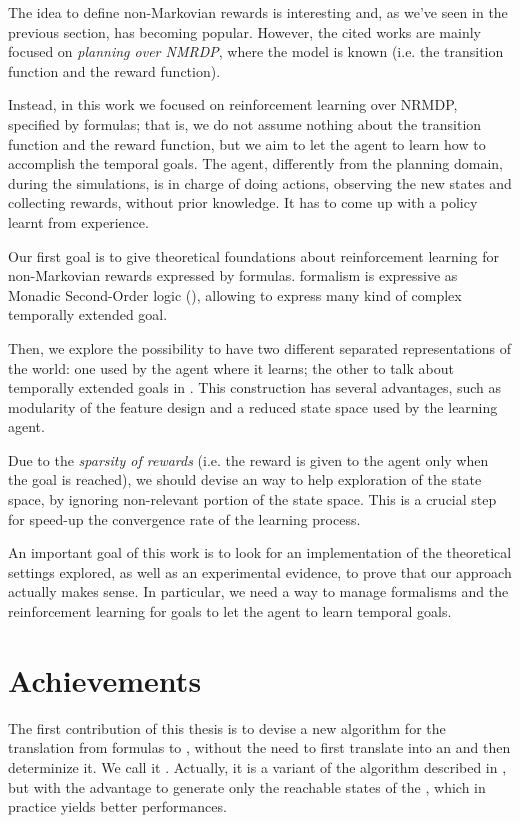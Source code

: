 The idea to define non-Markovian rewards is interesting and, as we've seen in the previous section, has becoming popular. However, the cited works are mainly focused on \emph{planning over NMRDP}, where the model is known (i.e. the transition function and the reward function). 

Instead, in this work we focused on reinforcement learning over NRMDP, specified by \LLf formulas; that is, we do not assume nothing about the transition function and the reward function, but we aim to let the agent to learn how to accomplish the temporal goals. The agent, differently from the planning domain, during the simulations, is in charge of doing actions, observing the new states and collecting rewards, without prior knowledge. It has to come up with a policy learnt from experience.

Our first goal is to give theoretical foundations about reinforcement learning for non-Markovian rewards expressed by \LLf formulas. \LDLf formalism is expressive as Monadic Second-Order logic (\MSO), allowing to express many kind of complex temporally extended goal.

Then, we explore the possibility to have two different separated representations of the world: one used by the agent where it learns; the other to talk about temporally extended goals in \LLf. This construction has several advantages, such as modularity of the feature design and a reduced state space used by the learning agent.

Due to the \emph{sparsity of rewards} (i.e. the reward is given to the agent only when the goal is reached), we should devise an way to help exploration of the state space, by ignoring non-relevant portion of the state space. This is a crucial step for speed-up the convergence rate of the learning process.

An important goal of this work is to look for an implementation of the theoretical settings explored, as well as an experimental evidence, to prove that our approach actually makes sense. In particular, we need a way to manage \LLf formalisms and the reinforcement learning for \LLf goals to let the agent to learn temporal goals.


\section{Achievements}\label{sect:intro-achievements}
The first contribution of this thesis is to devise a new algorithm for the translation from \LLf formulas to \DFA, without the need to first translate into an \NFA and then determinize it. We call it \LDLfToDFA. Actually, it is a variant of the \LDLfToNFA algorithm described in \citep{AAAI1817342}, but with the advantage to generate only the reachable states of the \DFA, which in practice yields better performances.

